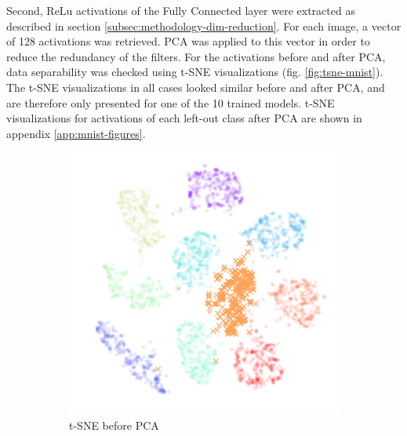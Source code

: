 \documentclass[10pt]{article}
\begin{document}
Second, ReLu activations of the Fully Connected layer were extracted as described in section \ref{subsec:methodology-dim-reduction}. For each image, a vector of 128 activations was retrieved. \gls{PCA} was applied to this vector in order to reduce the redundancy of the filters. For the activations before and after \gls{PCA}, data separability was checked using \gls{t-SNE} visualizations (fig. \ref{fig:tsne-mnist}). The \gls{t-SNE} visualizations in all cases looked similar before and after \gls{PCA}, and are therefore only presented for one of the 10 trained models. \gls{t-SNE} visualizations for activations of each left-out class after \gls{PCA} are shown in appendix \ref{app:mnist-figures}.

\begin{figure}[H]
    \centering
    \begin{subfigure}{.49\textwidth}
        \centering
        \includegraphics[width=\textwidth]{MNIST_t-SNE_wo_cl_7_before}
        \caption{\gls{t-SNE} before \gls{PCA}}
    \end{subfigure}
    \begin{subfigure}{.5\textwidth}
        \centering

\end{subfigure}
\end{figure}
\end{document}
